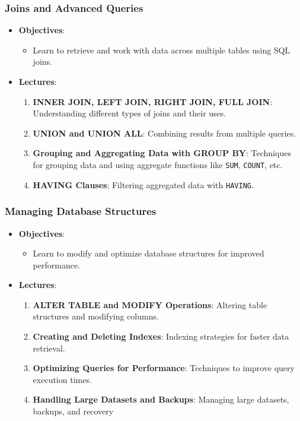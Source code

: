 \documentclass[
  letterpaper,
  DIV=11,
  numbers=noendperiod]{scrartcl}
\providecommand{\tightlist}{%
  \setlength{\itemsep}{0pt}\setlength{\parskip}{0pt}}\usepackage{longtable,booktabs,array}
\begin{document}
\subsubsection{Joins and Advanced
Queries}\label{joins-and-advanced-queries}

\begin{itemize}
\tightlist
\item
  \textbf{Objectives}:

  \begin{itemize}
  \tightlist
  \item
    Learn to retrieve and work with data across multiple tables using
    SQL joins.
  \end{itemize}
\item
  \textbf{Lectures}:

  \begin{enumerate}
  \def\labelenumi{\arabic{enumi}.}
  \tightlist
  \item
    \textbf{INNER JOIN, LEFT JOIN, RIGHT JOIN, FULL JOIN}: Understanding
    different types of joins and their uses.
  \item
    \textbf{UNION and UNION ALL}: Combining results from multiple
    queries.
  \item
    \textbf{Grouping and Aggregating Data with GROUP BY}: Techniques for
    grouping data and using aggregate functions like \texttt{SUM},
    \texttt{COUNT}, etc.
  \item
    \textbf{HAVING Clauses}: Filtering aggregated data with
    \texttt{HAVING}.
  \end{enumerate}
\end{itemize}

\subsubsection{Managing Database
Structures}\label{managing-database-structures}

\begin{itemize}
\tightlist
\item
  \textbf{Objectives}:

  \begin{itemize}
  \tightlist
  \item
    Learn to modify and optimize database structures for improved
    performance.
  \end{itemize}
\item
  \textbf{Lectures}:

  \begin{enumerate}
  \def\labelenumi{\arabic{enumi}.}
  \tightlist
  \item
    \textbf{ALTER TABLE and MODIFY Operations}: Altering table
    structures and modifying columns.
  \item
    \textbf{Creating and Deleting Indexes}: Indexing strategies for
    faster data retrieval.
  \item
    \textbf{Optimizing Queries for Performance}: Techniques to improve
    query execution times.
  \item
    \textbf{Handling Large Datasets and Backups}: Managing large
    datasets, backups, and recovery
  \end{enumerate}
\end{itemize}
\end{document}
